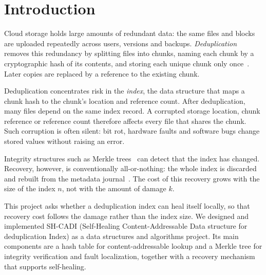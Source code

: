 \documentclass[conference]{IEEEtran}
\begin{document}
\section{Introduction}

Cloud storage holds large amounts of redundant data: the same files and blocks are uploaded repeatedly across users, versions and backups. \emph{Deduplication} removes this redundancy by splitting files into chunks, naming each chunk by a cryptographic hash of its contents, and storing each unique chunk only once~\cite{venti,datadomain}. Later copies are replaced by a reference to the existing chunk.

Deduplication concentrates risk in the \emph{index}, the data structure that maps a chunk hash to the chunk's location and reference count. After deduplication, many files depend on the same index record. A corrupted storage location, chunk reference or reference count therefore affects every file that shares the chunk. Such corruption is often silent: bit rot, hardware faults and software bugs change stored values without raising an error.

Integrity structures such as Merkle trees~\cite{merkle} can detect that the index has changed. Recovery, however, is conventionally all-or-nothing: the whole index is discarded and rebuilt from the metadata journal~\cite{venti}. The cost of this recovery grows with the size of the index $n$, not with the amount of damage $k$.

This project asks whether a deduplication index can heal itself locally, so that recovery cost follows the damage rather than the index size. We designed and implemented SH-CADI (Self-Healing Content-Addressable Data structure for deduplication Index) as a data structures and algorithms project. Its main components are a hash table for content-addressable lookup and a Merkle tree for integrity verification and fault localization, together with a recovery mechanism that supports self-healing.
\end{document}
